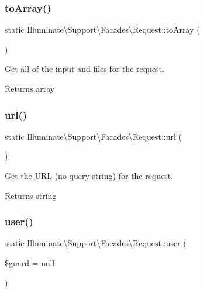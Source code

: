 \subsubsection{\texorpdfstring{to\+Array()}{toArray()}}
{\footnotesize\ttfamily static Illuminate\textbackslash{}\+Support\textbackslash{}\+Facades\textbackslash{}\+Request\+::to\+Array (\begin{DoxyParamCaption}{ }\end{DoxyParamCaption})\hspace{0.3cm}{\ttfamily [static]}}

Get all of the input and files for the request.

\begin{DoxyReturn}{Returns}
array 
\end{DoxyReturn}
\mbox{\label{class_illuminate_1_1_support_1_1_facades_1_1_request_a2989a827618b1759471556aaacfe446f}} 
\subsubsection{\texorpdfstring{url()}{url()}}
{\footnotesize\ttfamily static Illuminate\textbackslash{}\+Support\textbackslash{}\+Facades\textbackslash{}\+Request\+::url (\begin{DoxyParamCaption}{ }\end{DoxyParamCaption})\hspace{0.3cm}{\ttfamily [static]}}

Get the \mbox{\hyperlink{class_illuminate_1_1_support_1_1_facades_1_1_u_r_l}{U\+RL}} (no query string) for the request.

\begin{DoxyReturn}{Returns}
string 
\end{DoxyReturn}
\mbox{\label{class_illuminate_1_1_support_1_1_facades_1_1_request_ae16165d7bff8e8c3b2a1c8c58e59e719}} 
\subsubsection{\texorpdfstring{user()}{user()}}
{\footnotesize\ttfamily static Illuminate\textbackslash{}\+Support\textbackslash{}\+Facades\textbackslash{}\+Request\+::user (\begin{DoxyParamCaption}\item[{}]{\$guard = {\ttfamily null} }\end{DoxyParamCaption})\hspace{0.3cm}{\ttfamily [static]}}


